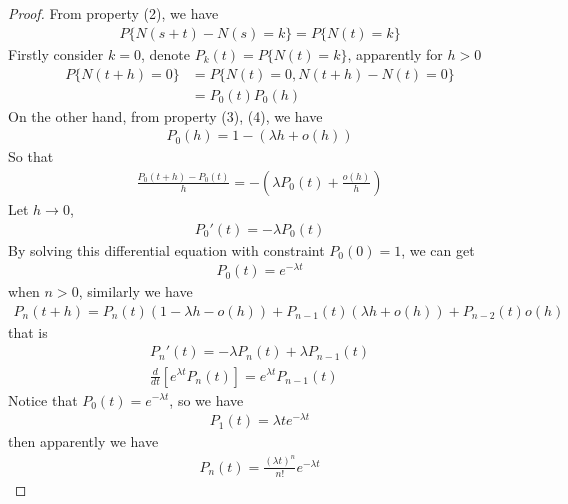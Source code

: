\documentclass[runningheads]{llncs}
\begin{document}
    \subsection{}
    \begin{proof}
        From property (2), we have
        \begin{align}
            P \{ N(s + t) - N(s) = k \} = P \{ N(t) = k \}
        \end{align}
        Firstly consider $k = 0$, denote $P_k(t) = P \{ N(t) = k \}$,
        apparently for $h > 0$
        \begin{align}
            P \{ N(t + h) = 0 \} &= P \{ N(t) = 0, N(t + h) - N(t) = 0 \} \\
            &= P_0(t)P_0(h)
        \end{align}
        On the other hand, from property (3), (4), we have
        \begin{align}
            P_0(h) = 1 - (\lambda h + o(h))
        \end{align}
        So that
        \begin{align}
            \frac{P_0(t + h) - P_0(t)}{h} = -(\lambda P_0(t) + \frac{o(h)}{h})
        \end{align}
        Let $h \rightarrow 0$,
        \begin{align}
            P_0'(t) = - \lambda P_0(t)
        \end{align}
        By solving this differential equation with constraint $P_0(0) = 1$,
        we can get
        \begin{align}
            P_0(t) = e^{-\lambda t}
        \end{align}
        when $n > 0$,
        similarly we have
        \begin{align}
            P_n(t + h) = P_n(t) (1 - \lambda h - o(h)) + 
            P_{n-1}(t) (\lambda h + o(h)) + P_{n-2}(t) o(h)
        \end{align}
        that is
        \begin{align}
            P_n'(t) = -\lambda P_n(t) + \lambda P_{n-1}(t) \\
            \frac{d}{dt}[e^{\lambda t} P_n(t)] = e^{\lambda t} P_{n-1}(t)
        \end{align}
        Notice that $P_0(t) = e^{-\lambda t}$, so we have
        \begin{align}
            P_1(t) = \lambda t e^{-\lambda t}
        \end{align}
        then apparently we have
        \begin{align}
            P_n(t) = \frac{(\lambda t)^n}{n!} e^{-\lambda t}
        \end{align}
    \end{proof}
\end{document}
